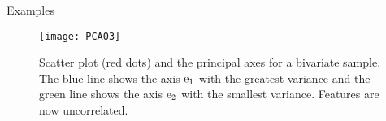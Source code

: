 

\begin{frame}{Examples}
\begin{figure}
\texttt{[image: PCA03]}
\caption{Scatter plot (red dots) and the principal axes for a bivariate sample. The blue line shows the axis ${\rm e}_1$ with the greatest variance and the green line shows the axis ${\rm e}_2$ with the smallest variance. Features are now uncorrelated.}
\end{figure}
\end{frame}

